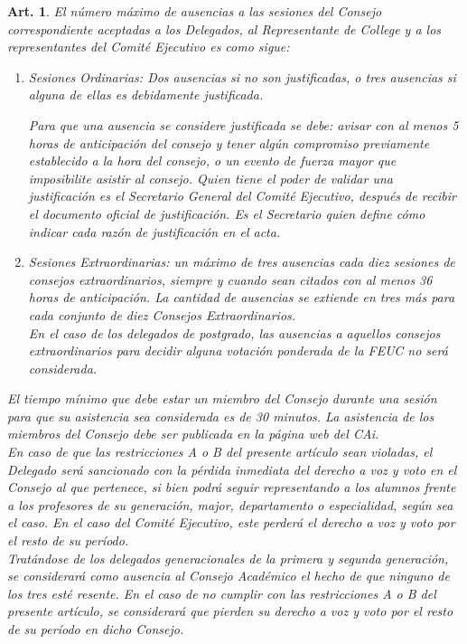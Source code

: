 \documentclass[letterpaper,11pt]{article}
\theoremstyle{plain}
\newtheorem{art}{Art.} %
\begin{document}
		\begin{art}\label{maxAusencias}
			El número máximo de ausencias a las sesiones del Consejo correspondiente aceptadas a los Delegados, al Representante de College y a los representantes del Comité Ejecutivo es como sigue:
			\begin{enumerate}
				\item \label{ausencias_A} Sesiones Ordinarias: Dos ausencias si no son justificadas, o tres ausencias si alguna de ellas es debidamente justificada.

				Para que una ausencia se considere justificada se debe: avisar con al menos 5 horas de anticipación del consejo y tener algún compromiso previamente establecido a la hora del consejo, o un evento de fuerza mayor que imposibilite asistir al consejo. 
				Quien tiene el poder de validar una justificación es el Secretario General del Comité Ejecutivo, después de recibir el documento oficial de justificación. Es el Secretario quien define cómo indicar cada razón de justificación en el acta.

				\item \label{ausencias_B} Sesiones Extraordinarias: un máximo de tres ausencias cada diez sesiones de consejos extraordinarios, siempre y cuando sean citados con al menos 36 horas de anticipación. La cantidad de ausencias se extiende en tres más para cada conjunto de diez Consejos Extraordinarios. \\
				En el caso de los delegados de postgrado, las ausencias a aquellos consejos extraordinarios para decidir alguna votación ponderada de la FEUC no será considerada.

			\end{enumerate}

			El tiempo mínimo que debe estar un miembro del Consejo durante una sesión para que su asistencia sea considerada es de 30 minutos. La asistencia de los miembros del Consejo debe ser publicada en la página web del CAi.\\
			En caso de que las restricciones A o B del presente artículo sean violadas, el Delegado será sancionado con la pérdida inmediata del derecho a voz y voto en el Consejo al que pertenece, si bien podrá seguir representando a los alumnos frente a los profesores de su generación, major, departamento o especialidad, según sea el caso. En el caso del Comité Ejecutivo, este perderá el derecho a voz y voto por el resto de su período.\\
			Tratándose de los delegados generacionales de la primera y segunda generación, se considerará como ausencia al Consejo Académico el hecho de que ninguno de los tres esté resente. En el caso de no cumplir con las restricciones A o B del presente artículo, se considerará que pierden su derecho a voz y voto por el resto de su período en dicho Consejo.
		\end{art}
\end{document}
